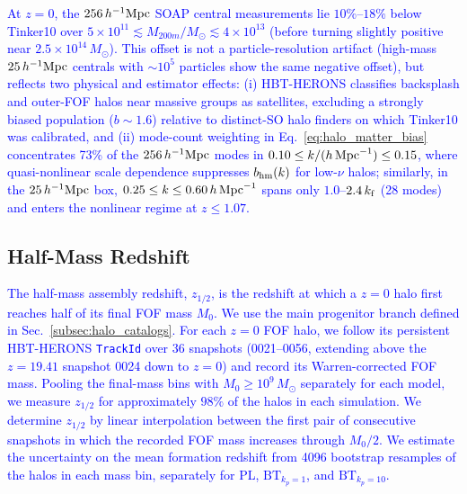 \documentclass[
 reprint,
 superscriptaddress,
 nofootinbib,
 nobibnotes,
 amsmath,
 amssymb,
 aps,
 prd,
 floatfix,
 longbibliography
]{revtex4-2}
\DeclareRobustCommand{\change}[1]{\textcolor{blue}{#1}}
\DeclareRobustCommand{\BTKPone}{\ensuremath{\mathrm{BT}_{k_p=1}}}
\DeclareRobustCommand{\BTKPten}{\ensuremath{\mathrm{BT}_{k_p=10}}}
\begin{document}
\change{At \(z=0\), the \(256\,h^{-1}{\rm Mpc}\) \textsc{SOAP} central measurements lie \(10\%\)--\(18\%\) below Tinker10 over \(5\times10^{11}\lesssim M_{200m}/M_\odot\lesssim4\times10^{13}\) (before turning slightly positive near \(2.5\times10^{14}\,M_\odot\)). This offset is not a particle-resolution artifact (high-mass \(25\,h^{-1}{\rm Mpc}\) centrals with \(\sim10^5\) particles show the same negative offset), but reflects two physical and estimator effects: (i) \textsc{HBT-HERONS} classifies backsplash and outer-FOF halos near massive groups as satellites, excluding a strongly biased population (\(b\sim1.6\)) relative to distinct-SO halo finders on which Tinker10 was calibrated, and (ii) mode-count weighting in Eq.~\eqref{eq:halo_matter_bias} concentrates 73\% of the \(256\,h^{-1}{\rm Mpc}\) modes in \(0.10\le k/(h\,{\rm Mpc}^{-1})\le0.15\), where quasi-nonlinear scale dependence suppresses \(b_{\rm hm}(k)\) for low-\(\nu\) halos; similarly, in the \(25\,h^{-1}{\rm Mpc}\) box, \(0.25\le k\le0.60\,h\,{\rm Mpc}^{-1}\) spans only \(1.0\)--\(2.4\,k_{\rm f}\) (28 modes) and enters the nonlinear regime at \(z\le1.07\).} 


\subsection{Half-Mass Redshift\label{subsub:HMR}}
\change{The half-mass assembly redshift, \(z_{1/2}\), is the redshift at which a \(z=0\) halo first reaches half of its final FOF mass \(M_0\). We use the main progenitor branch defined in Sec.~\ref{subsec:halo_catalogs}. For each \(z=0\) FOF halo, we follow its persistent \textsc{HBT-HERONS} \texttt{TrackId} over 36 snapshots (0021--0056, extending above the \(z=19.41\) snapshot 0024 down to \(z=0\)) and record its Warren-corrected FOF mass. Pooling the final-mass bins with \(M_0\ge 10^9\,M_\odot\) separately for each model, we measure \(z_{1/2}\) for approximately \(98\%\) of the halos in each simulation. We determine \(z_{1/2}\) by linear interpolation between the first pair of consecutive snapshots in which the recorded FOF mass increases through \(M_0/2\). We estimate the uncertainty on the mean formation redshift from 4096 bootstrap resamples of the halos in each mass bin, separately for PL, \BTKPone{}, and \BTKPten{}.}
\end{document}
